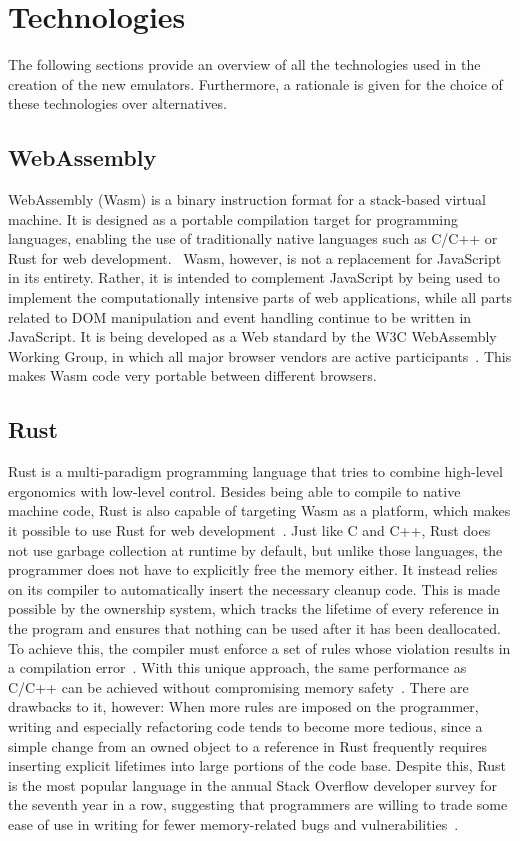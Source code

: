 \section {Technologies}
The following sections provide an overview of all the technologies used in the creation of the new emulators.
Furthermore, a rationale is given for the choice of these technologies over alternatives.

\subsection{WebAssembly}
WebAssembly (Wasm) is a binary instruction format for a stack-based virtual machine. It is designed as a portable compilation target for programming languages, enabling the use of traditionally native languages such as C/C++ or Rust for web development.~\cite{wasmweb}
Wasm, however, is not a replacement for JavaScript in its entirety.
Rather, it is intended to complement JavaScript by being used to implement the computationally intensive parts of web applications, while all parts related to DOM manipulation and event handling continue to be written in JavaScript.
It is being developed as a Web standard by the W3C WebAssembly Working Group, in which all major browser vendors are active participants~\cite{wasmmdn}.
This makes Wasm code very portable between different browsers.

\subsection{Rust}
Rust is a multi-paradigm programming language that tries to combine high-level ergonomics with low-level control. \cite[Introduction]{klabnik2019rust}
Besides being able to compile to native machine code, Rust is also capable of targeting Wasm as a platform, which makes it possible to use Rust for web development~\cite{rustwasm}.
Just like C and C++, Rust does not use garbage collection at runtime by default, but unlike those languages, the programmer does not have to explicitly free the memory either.
It instead relies on its compiler to automatically insert the necessary cleanup code. This is made possible by the ownership system, which tracks the lifetime of every reference in the program and ensures that nothing can be used after it has been deallocated.
To achieve this, the compiler must enforce a set of rules whose violation results in a compilation error~\cite[Chapter~4]{klabnik2019rust}.
With this unique approach, the same performance as C/C++ can be achieved without compromising memory safety~\cite{medin2021performance}.
There are drawbacks to it, however: When more rules are imposed on the programmer, writing and especially refactoring code tends to become more tedious, since a simple change from an owned object to a reference in Rust frequently requires inserting explicit lifetimes into large portions of the code base.
Despite this, Rust is the most popular language in the annual Stack Overflow developer survey for the seventh year in a row, suggesting that programmers are willing to trade some ease of use in writing for fewer memory-related bugs and vulnerabilities~\cite{sosurvey}.

